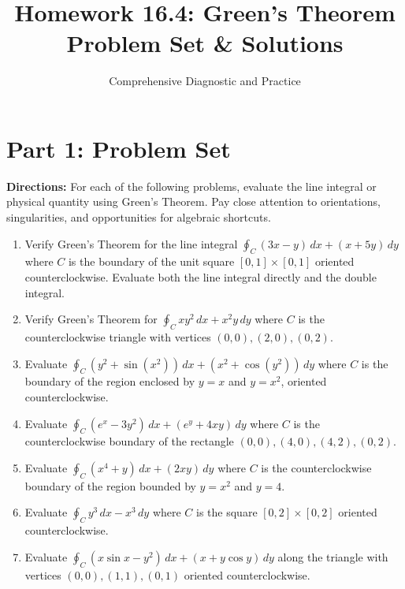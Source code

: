 \documentclass[11pt]{article}
\title{\textbf{Homework 16.4: Green's Theorem\\Problem Set \& Solutions}}
\author{Comprehensive Diagnostic and Practice}
\date{}
\begin{document}
\maketitle

\tableofcontents
\vspace{1cm}

\section{Part 1: Problem Set}

\textbf{Directions:} For each of the following problems, evaluate the line integral or physical quantity using Green's Theorem. Pay close attention to orientations, singularities, and opportunities for algebraic shortcuts. 

\begin{enumerate}[label=\textbf{Q\arabic*.}, leftmargin=*]
    \item Verify Green's Theorem for the line integral $\oint_C (3x - y) \,dx + (x + 5y) \,dy$ where $C$ is the boundary of the unit square $[0,1] \times [0,1]$ oriented counterclockwise. Evaluate both the line integral directly and the double integral.
    \item Verify Green's Theorem for $\oint_C xy^2 \,dx + x^2 y \,dy$ where $C$ is the counterclockwise triangle with vertices $(0,0), (2,0), (0,2)$.
    
    \item Evaluate $\oint_C (y^2 + \sin(x^2)) \,dx + (x^2 + \cos(y^2)) \,dy$ where $C$ is the boundary of the region enclosed by $y = x$ and $y = x^2$, oriented counterclockwise.
    \item Evaluate $\oint_C (e^x - 3y^2) \,dx + (e^y + 4xy) \,dy$ where $C$ is the counterclockwise boundary of the rectangle $(0,0), (4,0), (4,2), (0,2)$.
    \item Evaluate $\oint_C (x^4 + y) \,dx + (2xy) \,dy$ where $C$ is the counterclockwise boundary of the region bounded by $y = x^2$ and $y = 4$.
    \item Evaluate $\oint_C y^3 \,dx - x^3 \,dy$ where $C$ is the square $[0,2] \times [0,2]$ oriented counterclockwise.
    \item Evaluate $\oint_C (x \sin x - y^2) \,dx + (x + y \cos y) \,dy$ along the triangle with vertices $(0,0), (1,1), (0,1)$ oriented counterclockwise.
    

\end{enumerate}
\end{document}
